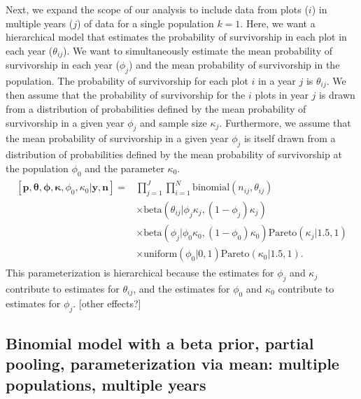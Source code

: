 \documentclass[12pt, oneside, titlepage]{article}   	%
\begin{document}
Next, we expand the scope of our analysis to include data from plots ($i$) in multiple years ($j$) of data for a single population $k=1$. Here, we want a hierarchical model that estimates the probability of survivorship in each plot in each year ($\theta_{ij}$). We want to simultaneously estimate the mean probability of survivorship in each year ($\phi_j$) and the mean probability of survivorship in the population. The probability of survivorship for each plot $i$ in a year $j$ is $\theta_{ij}$. We then assume that the probability of survivorship for the $i$ plots in year $j$ is drawn from a distribution of probabilities defined by the mean probability of survivorship in a given year $\phi_j$ and sample size $\kappa_j$. Furthermore, we assume that the mean probability of survivorship in a given year $\phi_j$ is itself drawn from a distribution of probabilities defined by the mean probability of survivorship at the population $\phi_0$ and the parameter $\kappa_0$. 
%
\begin{align}
  \begin{split}
[\bm{p},\bm{\theta},\bm{\phi},\bm{\kappa},\phi_0,\kappa_0|\bm{y},\bm{n}]  = & \prod_{j=1}^J\prod_{i=1}^N \mathrm{binomial}(n_{ij},\theta_{ij}) 
    \\ & \times \mathrm{beta} (  \theta_{ij} | \phi_j \kappa_j , (1-\phi_j) \kappa_j ) 
    \\ & \times \mathrm{beta} (  \phi_{j} | \phi_0 \kappa_0 , (1- \phi_0) \kappa_0 )  \mathrm{Pareto} ( \kappa_j | 1.5, 1 ) 
    \\ & \times \mathrm{uniform} ( \phi_0 | 0 , 1) \mathrm{Pareto} ( \kappa_0 | 1.5, 1 ). \label{eq:bayesianHyearpop} 
      \end{split}
\end{align}
%
This parameterization is hierarchical because the estimates for $\phi_j$ and $\kappa_j$ contribute to estimates for $\theta_{ij}$, and the estimates for $\phi_0$ and $\kappa_0$ contribute to estimates for $\phi_j$. [other effects?]

\subsection*{Binomial model with a beta prior, partial pooling, parameterization via mean: multiple populations, multiple years}
\end{document}
